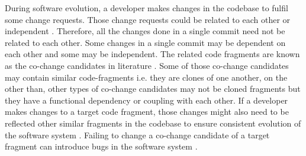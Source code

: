 \documentclass[review]{elsarticle}
\begin{document}

\vspace{0.5mm}
During software evolution, a developer makes changes in the codebase to fulfil some change requests. Those change requests could be related to each other or independent \cite{Mondal:Co-change-recommendation, Mondal:Connectivity:co-changed}. Therefore, all the changes done in a single commit need not be related to each other. Some changes in a single commit may be dependent on each other and some may be independent. The related code fragments are known as the co-change candidates in literature \citep{Mondal-2014-PRC-2597073-2597104rankingCoChange}. Some of those co-change candidates may contain similar code-fragments i.e. they are clones of one another, on the other than, other types of co-change candidates may not be cloned fragments but they have a functional dependency or coupling with each other. If a developer makes changes to a target code fragment, those changes might also need to be reflected other similar fragments in the codebase to ensure consistent evolution of the software system \cite{Mondal:Association:Rules, Mondal:Context:Adaptation:Bugs}. Failing to change a co-change candidate of a target fragment can introduce bugs in the software system \cite{Judith:Bug:Replication, Judith:Micro:Regular:Clone}. 
\end{document}
